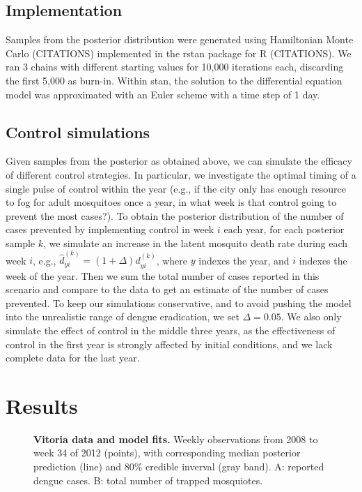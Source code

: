 \documentclass[10pt,letterpaper]{article}
\begin{document}
\subsection*{Implementation}
 
Samples from the posterior distribution were generated using Hamiltonian Monte Carlo (CITATIONS) implemented in the rstan package for R (CITATIONS). 
We ran 3 chains with different starting values for 10,000 iterations each, discarding the first 5,000 as burn-in.
Within stan, the solution to the differential equation model was approximated with an Euler scheme with a time step of 1 day.  

\subsection*{Control simulations}

Given samples from the posterior as obtained above, we can simulate the efficacy of different control strategies.
In particular, we investigate the optimal timing of a single pulse of control within the year (e.g., if the city only has enough resource to fog for adult mosquitoes once a year, in what week is that control going to prevent the most cases?).
To obtain the posterior distribution of the number of cases prevented by implementing control in week $i$ each year, for each posterior sample $k$, we simulate an increase in the latent mosquito death rate during each week $i$, e.g.,
$\hat{d}^{(k)}_{yi} = (1 + \Delta) d^{(k)}_{yi}$, where $y$ indexes the year, and $i$ indexes the week of the year.
Then we sum the total number of cases reported in this scenario and compare to the data to get an estimate of the number of cases prevented.
To keep our simulations conservative, and to avoid pushing the model into the unrealistic range of dengue eradication, we set $\Delta = 0.05$.
We also only simulate the effect of control in the middle three years, as the effectiveness of control in the first year is strongly affected by initial conditions, and we lack complete data for the last year.

\section*{Results}

\begin{figure}[!h]
\caption{{\bf Vitoria data and model fits.}
Weekly observations from 2008 to week 34 of 2012 (points), with corresponding median posterior prediction (line) and 80\% credible inverval (gray band). A: reported dengue cases. B: total number of trapped mosquiotes.
}
\label{timeseries}
\end{figure}
\end{document}
